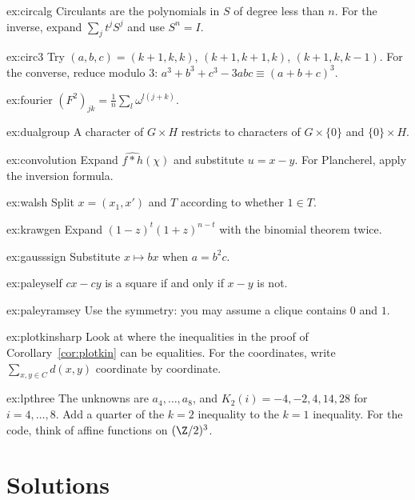 \begin{hint}{ex:circalg}
Circulants are the polynomials in $S$ of degree less than $n$. For the inverse, expand $\sum_jt^jS^j$ and use $S^n=I$.
\end{hint}
\begin{hint}{ex:circ3}
Try $(a,b,c)=(k+1,k,k)$, $(k+1,k+1,k)$, $(k+1,k,k-1)$. For the converse, reduce modulo $3$: $a^3+b^3+c^3-3abc\equiv(a+b+c)^3$.
\end{hint}
\begin{hint}{ex:fourier}
$(F^2)_{jk}=\frac1n\sum_l\omega^{l(j+k)}$.
\end{hint}
\begin{hint}{ex:dualgroup}
A character of $G\times H$ restricts to characters of $G\times\{0\}$ and $\{0\}\times H$.
\end{hint}
\begin{hint}{ex:convolution}
Expand $\widehat{f*h}(\chi)$ and substitute $u=x-y$. For Plancherel, apply the inversion formula.
\end{hint}
\begin{hint}{ex:walsh}
Split $x=(x_1,x')$ and $T$ according to whether $1\in T$.
\end{hint}
\begin{hint}{ex:krawgen}
Expand $(1-z)^t(1+z)^{n-t}$ with the binomial theorem twice.
\end{hint}
\begin{hint}{ex:gausssign}
Substitute $x\mapsto bx$ when $a=b^2c$.
\end{hint}
\begin{hint}{ex:paleyself}
$cx-cy$ is a square if and only if $x-y$ is not.
\end{hint}
\begin{hint}{ex:paleyramsey}
Use the symmetry: you may assume a clique contains $0$ and $1$.
\end{hint}
\begin{hint}{ex:plotkinsharp}
Look at where the inequalities in the proof of Corollary~\ref{cor:plotkin} can be equalities. For the coordinates, write
$\sum_{x,y\in C}d(x,y)$ coordinate by coordinate.
\end{hint}
\begin{hint}{ex:lpthree}
The unknowns are $a_4,\dots,a_8$, and $K_2(i)=-4,-2,4,14,28$ for $i=4,\dots,8$. Add a quarter of the $k=2$ inequality to the
$k=1$ inequality. For the code, think of affine functions on $(\Z/2)^3$.
\end{hint}

\section{Solutions}

